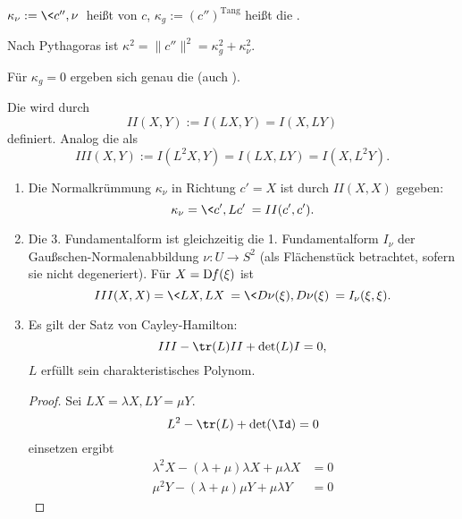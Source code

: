 \begin{df}
	$\kappa_\nu := \<c'', \nu\>$ heißt  von $c$, $\kappa_g := (c'')^{\text{Tang}}$ heißt die .
	\begin{note}
		Nach Pythagoras ist $\kappa^2 = \|c''\|^2 = \kappa_g^2 + \kappa_\nu^2$.

		Für $\kappa_g = 0$ ergeben sich genau die  (auch ).
	\end{note}
\end{df}

\begin{df}
	Die  wird durch
	\[
		II(X, Y) := I (LX, Y) = I(X, LY)
	\]
	definiert.
	Analog die  als
	\[
		III(X, Y) := I(L^2X, Y) = I(LX, LY) = I(X, L^2Y).
	\]
\end{df}

\begin{kor}
	\begin{enumerate}[1)]
		\item
			Die Normalkrümmung $\kappa_\nu$ in Richtung $c' = X$ ist durch $II(X, X)$ gegeben:
			\[
				\kappa_\nu = \<c', Lc'\> = II(c', c').
			\]
		\item
			Die 3. Fundamentalform ist gleichzeitig die 1. Fundamentalform $I_\nu$ der Gaußschen-Normalenabbildung $\nu: U \to S^2$ (als Flächenstück betrachtet, sofern sie nicht degeneriert).
			Für $X = \Df(\xi)$ ist
			\[
				III(X, X) = \<LX, LX\> = \<D\nu(\xi), D\nu(\xi)\> = I_\nu(\xi, \xi).
			\]
		\item
			Es gilt der Satz von Cayley-Hamilton:
			\[
				III - \tr(L) II + \det(L) I = 0,
			\]
			$L$ erfüllt sein charakteristisches Polynom.
			\begin{proof}
				Sei $LX = \lambda X, LY = \mu Y$.
				\[
					L^2 - \tr(L) + \det(\Id) = 0
				\]
				einsetzen ergibt
				\begin{align*}
					\lambda^2 X - (\lambda + \mu) \lambda X + \mu \lambda X &= 0 \\
					\mu^2 Y - (\lambda + \mu) \mu Y + \mu \lambda Y &= 0
				\end{align*}
			\end{proof}
	\end{enumerate}
\end{kor}

